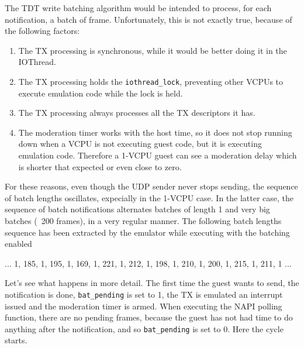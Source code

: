 The TDT write batching algorithm would be intended to process, for each notification, a batch of frame. Unfortunately, this is not
exactly true, because of the following factors:
\begin{enumerate}
    \item The TX processing is synchronous, while it would be better doing it in the IOThread.
    \item The TX processing holds the \texttt{iothread\_lock}, preventing other VCPUs to execute emulation code while the lock is held.
    \item The TX processing always processes all the TX descriptors it has.
    \item The moderation timer works with the host time, so it does not stop running down when a VCPU is not executing guest code, but
	  it is executing emulation code. Therefore a 1-VCPU guest can see a moderation delay which is shorter that expected or even
	  close to zero.
\end{enumerate}

For these reasons, even though the UDP sender never stops sending, the sequence of batch lengths oscillates, expecially in the 1-VCPU case.
In the latter case, the sequence of batch notifications alternates batches of length 1 and very big batches (~200 frames), in a very 
regular manner. The following batch lengths sequence has been extracted by the emulator while executing with the batching enabled
\begin{center}
... 1, 185, 1, 195, 1, 169, 1, 221, 1, 212, 1, 198, 1, 210, 1, 200, 1, 215, 1, 211, 1 ...
\end{center}

Let's see what happens in more detail. The first time the guest wants to send, the notification is done, \texttt{bat\_pending} is set to 1,
the TX is emulated an interrupt issued and the moderation timer is armed. When executing the NAPI polling function, there are no 
pending frames, because the guest has not had time to do anything after the notification, and so \texttt{bat\_pending} is set to 0.
Here the cycle starts.


